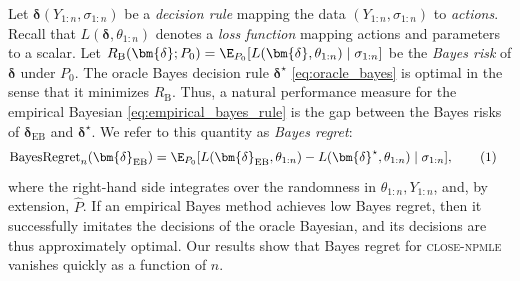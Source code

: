 \documentclass[12pt, reqno]{amsart}
\newcommand\numberthis{\addtocounter{equation}{1}\tag{\theequation}}
\newcommand{\RB}{R_{\mathrm{B}}}
\newcommand{\regret}{\mathrm{BayesRegret}_n}
\newcommand{\EB}{\mathrm{EB}}
\newcommand{\close}{\textsc{close}}
\newcommand{\npmle}{\textsc{npmle}}
\newcommand{\closenpmle}{\close-\npmle}
\newcommand{\bdelta}{\bm{\delta}}
\numberwithin{equation}{section}
\begin{document}
Let $\bdelta(Y_{1:n}, \sigma_{1:n})$ be
a \emph{decision rule} mapping the data $(Y_{1:n},
\sigma_{1:n})$ to \emph{actions}. Recall that $L(\bdelta,
\theta_{1:n})$ denotes a \emph{loss function} mapping actions and parameters to a scalar.
Let $\RB (\bdelta; P_0) = \E_{P_0}[L(\bdelta,
\theta_{1:n}) \mid
\sigma_{1:n}]$ be the \emph{Bayes risk} of $\bdelta$ under $P_0$. The oracle Bayes
decision rule $\bdelta^\star$ \eqref{eq:oracle_bayes} is optimal in the sense that it
minimizes $\RB$. Thus, a natural performance measure for the empirical Bayesian
\eqref{eq:empirical_bayes_rule} is the gap between the Bayes risks of $\bdelta_ {\EB}$ and
$\bdelta^\star$. We refer to this quantity as \emph{Bayes regret}:
\begin{align*}
\regret(\bdelta_{\EB}) &= \E_{P_0}
[L
(\bdelta_{\EB}, \theta_{1:n}) - L(\bdelta^\star, \theta_{1:n}) \mid \sigma_{1:n}],
\numberthis \label{eq:regret_def}
\end{align*}
where the right-hand side integrates over the randomness in $\theta_{1:n}, Y_{1:n}$, and,
 by extension, $\hat P$. %
If an empirical Bayes method achieves low Bayes regret, then it successfully imitates the
decisions of the oracle Bayesian, and its decisions are thus approximately
optimal. Our results show that Bayes regret for \closenpmle{} vanishes quickly as  a
function of $n$. 
\end{document}
